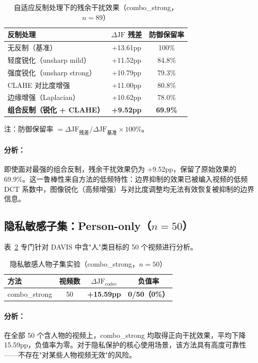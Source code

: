\documentclass[UTF8,a4paper,12pt]{ctexart}
\begin{document}
\begin{table}[H]
\centering
\caption{自适应反制处理下的残余干扰效果（combo\_strong，$n=89$）}
\label{tab:adaptive}
\begin{tabular}{lcc}
\toprule
反制处理 & $\Delta\text{JF}$ 残差 & 防御保留率 \\
\midrule
无反制（基准） & +13.61pp & 100\% \\
轻度锐化（unsharp mild） & +11.52pp & 84.8\% \\
强度锐化（unsharp strong） & +10.79pp & 79.3\% \\
CLAHE 对比度增强 & +11.00pp & 80.8\% \\
边缘增强（Laplacian） & +10.62pp & 78.0\% \\
\midrule
\textbf{组合反制（锐化 + CLAHE）} & \textbf{+9.52pp} & \textbf{69.9\%} \\
\bottomrule
\end{tabular}
\smallskip

\small 注：防御保留率 $= \Delta\text{JF}_{\text{残差}} / \Delta\text{JF}_{\text{基准}} \times 100\%$。
\end{table}

\paragraph{分析：}即使面对最强的组合反制，残余干扰效果仍为 +9.52pp，保留了原始效果的 69.9\%。这一鲁棒性来自方法的低频特性：边界抑制的效果已被编入视频的低频 DCT 系数中，图像锐化（高频增强）与对比度调整均无法有效恢复被抑制的边界信息。

\subsection{隐私敏感子集：Person-only（$n=50$）}

表~\ref{tab:person} 专门针对 DAVIS 中含"人"类目标的 50 个视频进行分析。

\begin{table}[H]
\centering
\caption{隐私敏感人物子集实验（combo\_strong，$n=50$）}
\label{tab:person}
\begin{tabular}{lccc}
\toprule
方法 & 视频数 & $\Delta\text{JF}_{\text{codec}}$ & 负值率 \\
\midrule
combo\_strong & 50 & \textbf{+15.59pp} & \textbf{0/50（0\%）} \\
\bottomrule
\end{tabular}
\end{table}

\paragraph{分析：}在全部 50 个含人物的视频上，combo\_strong 均取得正向干扰效果，平均下降 15.59pp，负值率为零。对于隐私保护的核心使用场景，该方法具有高度可靠性——不存在"对某些人物视频无效"的风险。
\end{document}
